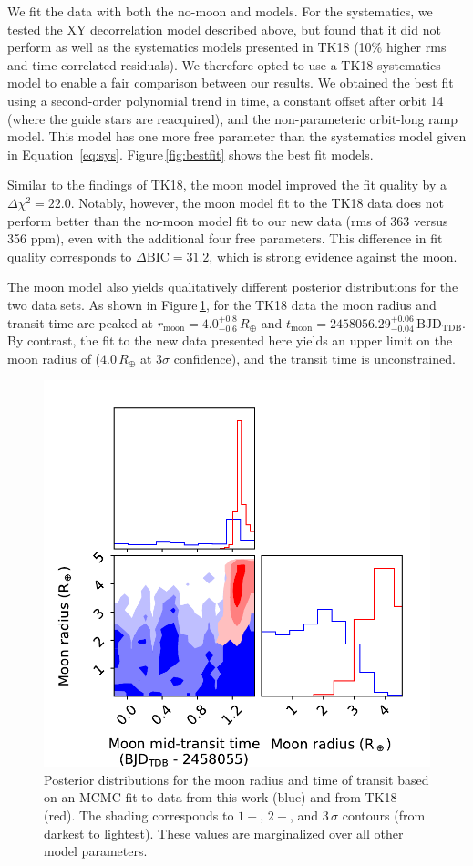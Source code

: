\documentclass[twocolumn]{aastex62}
\begin{document}
We fit the data with both the no-moon and models.  For the systematics, we tested the XY decorrelation model described above, but found that it did not perform as well as the systematics models presented in TK18 (10\% higher rms and time-correlated residuals).  We therefore opted to use a TK18 systematics model to enable a fair comparison between our results. We obtained the best fit using a second-order polynomial trend in time, a constant offset after orbit 14 (where the guide stars are reacquired), and the non-parameteric orbit-long ramp model. This model has one more free parameter than the systematics model given in Equation~\ref{eq:sys}. Figure\,\ref{fig:bestfit} shows the best fit models. 

Similar to the findings of TK18, the moon model improved the fit quality by a $\Delta\chi^2 = 22.0$. Notably, however, the moon model fit to the TK18 data does not perform better than the no-moon model fit to our new data (rms of 363 versus 356 ppm), even with the additional four free parameters.  This difference in fit quality corresponds to $\Delta\mathrm{BIC} = 31.2$, which is strong evidence against the moon.  

The moon model also yields qualitatively different posterior distributions for the two data sets.  As shown in Figure\,\ref{fig:corner}, for the TK18 data the moon radius and transit time are peaked at $r_\mathrm{moon} = 4.0^{+0.8}_{-0.6}\,R_\oplus$  and $t_\mathrm{moon} =  2458056.29^{+0.06}_{-0.04}\,\mathrm{BJD_{TDB}}$. By contrast, the fit to the new data presented here yields an upper limit on the moon radius of ($4.0\,R_\oplus$ at $3\sigma$ confidence), and the transit time is unconstrained.

\begin{figure}
\includegraphics[width = 0.5 \textwidth]{figures/fig5_pairs.pdf}
    \caption{Posterior distributions for the moon radius and time of transit based on an MCMC fit to data from this work (blue) and from TK18 (red). The shading corresponds to $1-$, $2-$, and $3\,\sigma$ contours (from darkest to lightest). These values are marginalized over all other model parameters.} 
\label{fig:corner}
\end{figure}
\end{document}

